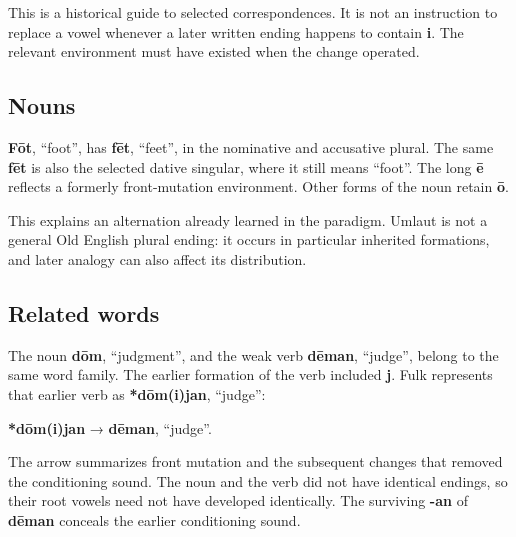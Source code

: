 \endgroup
This is a historical guide to selected correspondences. It is not an instruction to replace a vowel whenever a later written ending happens to contain \textbf{i}. The relevant environment must have existed when the change operated.\par
\subsection*{Nouns}
\textbf{Fōt}, “foot”, has \textbf{fēt}, “feet”, in the nominative and accusative plural. The same \textbf{fēt} is also the selected dative singular, where it still means “foot”. The long \textbf{ē} reflects a formerly front-mutation environment. Other forms of the noun retain \textbf{ō}.\par
This explains an alternation already learned in the paradigm. Umlaut is not a general Old English plural ending: it occurs in particular inherited formations, and later analogy can also affect its distribution.\par
\subsection*{Related words}
The noun \textbf{dōm}, “judgment”, and the weak verb \textbf{dēman}, “judge”, belong to the same word family. The earlier formation of the verb included \textbf{j}. Fulk represents that earlier verb as \textbf{*dōm(i)jan}, “judge”:\par
\textbf{*dōm(i)jan} → \textbf{dēman}, “judge”.\par
The arrow summarizes front mutation and the subsequent changes that removed the conditioning sound. The noun and the verb did not have identical endings, so their root vowels need not have developed identically. The surviving \textbf{-an} of \textbf{dēman} conceals the earlier conditioning sound.\par
